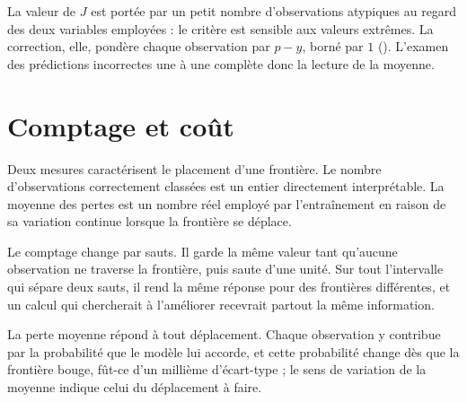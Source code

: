 \begin{resultat}
La valeur de $J$ est portée par un petit nombre d'observations atypiques au
regard des deux variables employées : le critère est sensible aux valeurs
extrêmes. La correction, elle, pondère chaque observation par $p-y$, borné par
$1$ (). L'examen des prédictions incorrectes une à une
complète donc la lecture de la moyenne.
\end{resultat}

\section{Comptage et coût}

Deux mesures caractérisent le placement d'une frontière. Le nombre
d'observations correctement classées est un entier directement interprétable.
La moyenne des pertes est un nombre réel employé par l'entraînement en raison de
sa variation continue lorsque la frontière se déplace.

Le comptage change par sauts. Il garde la même valeur tant qu'aucune observation
ne traverse la frontière, puis saute d'une unité. Sur tout l'intervalle qui
sépare deux sauts, il rend la même réponse pour des frontières différentes, et un
calcul qui chercherait à l'améliorer recevrait partout la même information.

La perte moyenne répond à tout déplacement. Chaque observation y contribue par la
probabilité que le modèle lui accorde, et cette probabilité change dès que la
frontière bouge, fût-ce d'un millième d'écart-type ; le sens de variation de la
moyenne indique celui du déplacement à faire.

